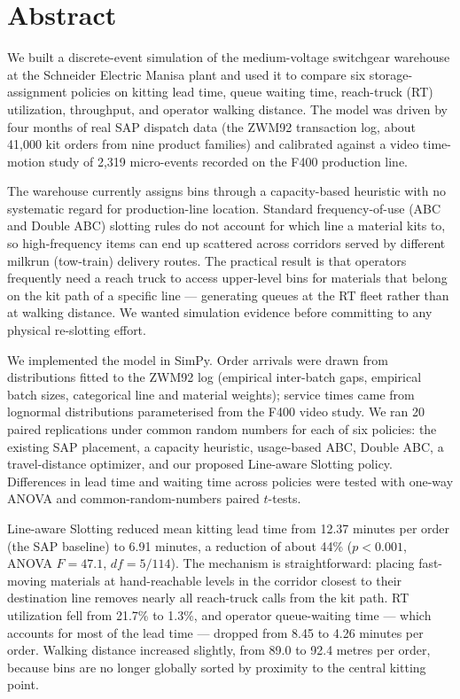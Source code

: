 \section{Abstract}\label{sec:abstract}

We built a discrete-event simulation of the medium-voltage switchgear
warehouse at the Schneider Electric Manisa plant and used it to compare
six storage-assignment policies on kitting lead time, queue waiting time,
reach-truck (RT) utilization, throughput, and operator walking distance.
The model was driven by four months of real SAP dispatch data (the
ZWM92 transaction log, about 41,000 kit orders from nine product families)
and calibrated against a video time-motion study of 2,319 micro-events
recorded on the F400 production line.

The warehouse currently assigns bins through a capacity-based heuristic
with no systematic regard for production-line location. Standard
frequency-of-use (ABC and Double ABC) slotting rules do not
account for which line a material kits to, so high-frequency items can
end up scattered across corridors served by different milkrun (tow-train) delivery routes.
The practical result is that operators frequently need a reach truck
to access upper-level bins for materials that belong on the kit path of
a specific line --- generating queues at the RT fleet rather than at
walking distance. We wanted simulation evidence before committing to
any physical re-slotting effort.

We implemented the model in SimPy. Order arrivals were drawn from
distributions fitted to the ZWM92 log (empirical inter-batch gaps,
empirical batch sizes, categorical line and material weights); service
times came from lognormal distributions parameterised from the F400
video study. We ran 20 paired replications under common random numbers
for each of six policies: the existing SAP placement, a capacity
heuristic, usage-based ABC, Double ABC, a travel-distance
optimizer, and our proposed Line-aware Slotting policy. Differences in
lead time and waiting time across policies were tested with one-way
ANOVA and common-random-numbers paired $t$-tests.

Line-aware Slotting reduced mean kitting lead time from 12.37 minutes
per order (the SAP baseline) to 6.91 minutes, a reduction of about 44\%
($p < 0.001$, ANOVA $F = 47.1$, $df = 5/114$). The mechanism is
straightforward: placing fast-moving materials at hand-reachable levels
in the corridor closest to their destination line removes nearly
all reach-truck calls from the kit path. RT utilization fell from 21.7\%
to 1.3\%, and operator queue-waiting time --- which accounts for most
of the lead time --- dropped from 8.45 to 4.26 minutes per order.
Walking distance increased slightly, from 89.0 to 92.4 metres per order,
because bins are no longer globally sorted by proximity to the central
kitting point.

